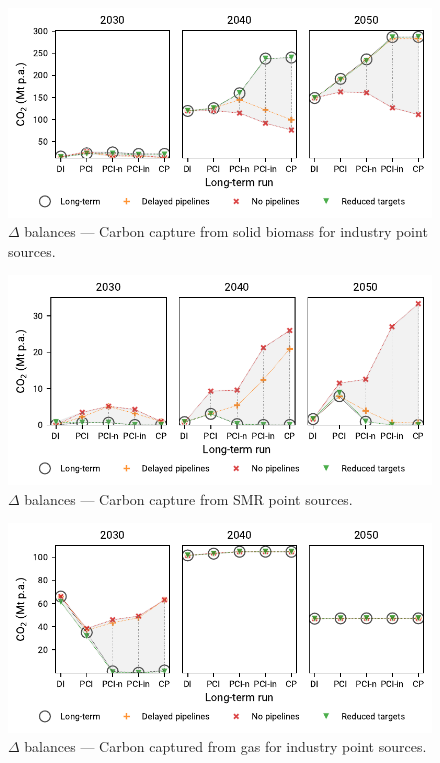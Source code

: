 \documentclass[final,5p,times,twocolumn,sort&compress]{elsarticle}
\begin{document}
\begin{figure}[htbp]
  \centering
  \includegraphics[width=\linewidth]{delta_balances_solid biomass for industry CC}
  \caption{$\Delta$ balances --- Carbon capture from solid biomass for industry point sources.}
  \label{fig:delta_balances_biomass_industry_cc}
\end{figure}

\begin{figure}[htbp]
  \centering
  \includegraphics[width=\linewidth]{delta_balances_SMR CC}
  \caption{$\Delta$ balances --- Carbon capture from SMR point sources.}
  \label{fig:delta_balances_smr_cc}
\end{figure}

\begin{figure}[htbp]
  \centering
  \includegraphics[width=\linewidth]{delta_balances_gas for industry CC}
  \caption{$\Delta$ balances --- Carbon captured from gas for industry point sources.}
  \label{fig:delta_balances_gas_for_industry}
\end{figure}
\end{document}
